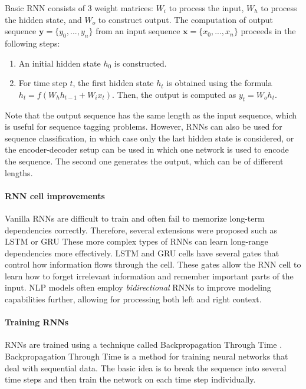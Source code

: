 Basic RNN consists of 3 weight matrices: $W_{i}$ to process the input, $W_h$ to process the hidden state, and $W_o$ to construct output.
The computation of output sequence $\mathbf{y} = \{y_0, ..., y_n\}$ from an input sequence $\mathbf{x} = \{x_0, ..., x_n\}$ proceeds in the following steps:
\begin{enumerate}
    \item An initial hidden state $h_0$ is constructed.
    \item For time step $t$, the first hidden state $h_t$ is obtained using the formula $h_t = f(W_hh_{t-1} + W_ix_t)$. Then, the output is computed as $y_t = W_oh_t$.
\end{enumerate}
Note that the output sequence has the same length as the input sequence, which is useful for sequence tagging problems.
However, RNNs can also be used for sequence classification, in which case only the last hidden state is considered, or the encoder-decoder setup can be used in which one network is used to encode the sequence.
The second one generates the output, which can be of different lengths.

\paragraph{RNN cell improvements}
Vanilla RNNs are difficult to train and often fail to memorize long-term dependencies correctly.
Therefore, several extensions were proposed such as LSTM \cite{hochreiter1997} or GRU \cite{cho-etal-2014-properties}
These more complex types of RNNs can learn long-range dependencies more effectively.
LSTM and GRU cells have several gates that control how information flows through the cell.
These gates allow the RNN cell to learn how to forget irrelevant information and remember important parts of the input.
NLP models often employ \emph{bidirectional} RNNs to improve modeling capabilities further, allowing for processing both left and right context.

\paragraph{Training RNNs}
RNNs are trained using a technique called Backpropagation Through Time \cite{werbos1990backpropagation}.
Backpropagation Through Time is a method for training neural networks that deal with sequential data.
The basic idea is to break the sequence into several time steps and then train the network on each time step individually.

